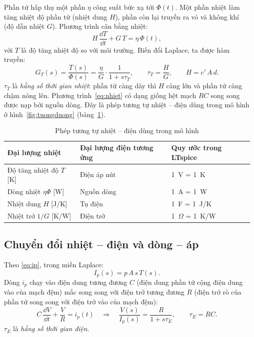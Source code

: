 Phần tử hấp thụ một phần $\eta$ công suất bức xạ tới $\Phi(t)$. Một phần nhiệt làm tăng nhiệt độ phần tử (nhiệt dung $H$), phần còn lại truyền ra vỏ và không khí (độ dẫn nhiệt $G$). Phương trình cân bằng nhiệt:
\begin{equation}
  H\,\frac{\dd T}{\dd t} + G\,T = \eta\,\Phi(t),
  \label{eq:nhiet}
\end{equation}
với $T$ là độ tăng nhiệt độ so với môi trường. Biến đổi Laplace, ta được hàm truyền:
\begin{equation}
  G_T(s) = \frac{T(s)}{\Phi(s)} = \frac{\eta}{G}\cdot\frac{1}{1+s\tau_T},\qquad \tau_T = \frac{H}{G},\qquad H = c'\,A\,d .
  \label{eq:GT}
\end{equation}
$\tau_T$ là \emph{hằng số thời gian nhiệt}: phần tử càng dày thì $H$ càng lớn và phần tử càng chậm nóng lên. Phương trình~\eqref{eq:nhiet} có dạng giống hệt mạch $RC$ song song được nạp bởi nguồn dòng. Đây là phép tương tự nhiệt -- điện dùng trong mô hình ở hình~\ref{fig:tuongduong} (bảng~\ref{tab:tuongtu}).

\begin{table}[!htb]
\centering
\caption{Phép tương tự nhiệt -- điện dùng trong mô hình}
\label{tab:tuongtu}
\small
\begin{tabular}{@{}lll@{}}
\toprule
\textbf{Đại lượng nhiệt} & \textbf{Đại lượng điện tương ứng} & \textbf{Quy ước trong LTspice} \\ \midrule
Độ tăng nhiệt độ $T$ [K] & Điện áp nút & 1~V = 1~K \\
Dòng nhiệt $\eta\Phi$ [W] & Nguồn dòng & 1~A = 1~W \\
Nhiệt dung $H$ [J/K] & Tụ điện & 1~F = 1~J/K \\
Nhiệt trở $1/G$ [K/W] & Điện trở & 1~$\Omega$ = 1~K/W \\
\bottomrule
\end{tabular}
\end{table}

\subsection{Chuyển đổi nhiệt -- điện và dòng -- áp}

Theo \eqref{eq:ip}, trong miền Laplace:
\begin{equation}
  I_p(s) = p\,A\,s\,T(s).
  \label{eq:GTI}
\end{equation}
Dòng $i_p$ chạy vào điện dung tương đương $C$ (điện dung phần tử cộng điện dung vào của mạch đệm) mắc song song với điện trở tương đương $R$ (điện trở rò của phần tử song song với điện trở vào của mạch đệm):
\begin{equation}
  C\,\frac{\dd V}{\dd t} + \frac{V}{R} = i_p(t)
  \quad\Rightarrow\quad
  \frac{V(s)}{I_p(s)} = \frac{R}{1+s\tau_E},\qquad \tau_E = RC .
  \label{eq:GIV}
\end{equation}
$\tau_E$ là \emph{hằng số thời gian điện}.

